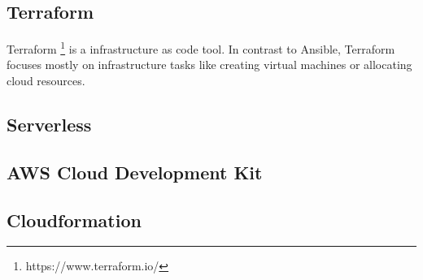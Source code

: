 \subsection{Terraform}

Terraform \footnote{https://www.terraform.io/} is a infrastructure as code tool. In contrast to Ansible, 
Terraform focuses mostly on infrastructure tasks like creating virtual machines or allocating cloud resources.

\subsection{Serverless}
\subsection{AWS Cloud Development Kit}
\subsection{Cloudformation}
